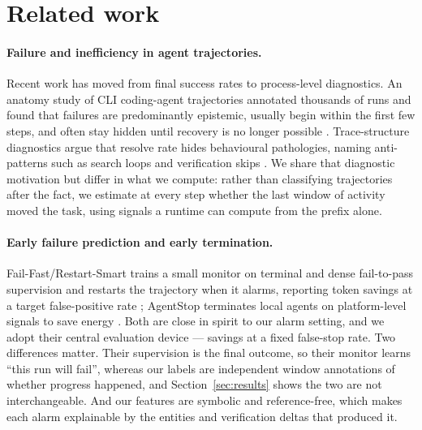 \section{Related work}
\label{sec:related}

\paragraph{Failure and inefficiency in agent trajectories.}
Recent work has moved from final success rates to process-level diagnostics. An anatomy study of CLI
coding-agent trajectories annotated thousands of runs and found that failures are predominantly
epistemic, usually begin within the first few steps, and often stay hidden until recovery is no longer
possible \cite{zhao2026failure}. Trace-structure diagnostics argue that resolve rate hides behavioural
pathologies, naming anti-patterns such as search loops and verification skips \cite{shu2026traceprobe}. We
share that diagnostic motivation but differ in what we compute: rather than classifying trajectories after
the fact, we estimate at every step whether the last window of activity moved the task, using signals a
runtime can compute from the prefix alone.

\paragraph{Early failure prediction and early termination.}
Fail-Fast/Restart-Smart trains a small monitor on terminal and dense fail-to-pass supervision and restarts
the trajectory when it alarms, reporting token savings at a target false-positive rate
\cite{wang2026failfast}; AgentStop terminates local agents on platform-level signals to save energy
\cite{pham2026agentstop}. Both are close in spirit to our alarm setting, and we adopt their central
evaluation device --- savings at a fixed false-stop rate. Two differences matter. Their supervision is the
final outcome, so their monitor learns ``this run will fail'', whereas our labels are independent window
annotations of whether progress happened, and Section~\ref{sec:results} shows the two are not
interchangeable. And our features are symbolic and reference-free, which makes each alarm explainable by
the entities and verification deltas that produced it.

